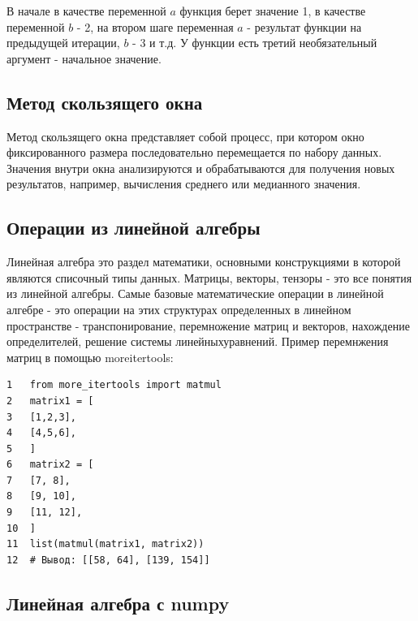 \documentclass[12pt, a4paper]{article}
\begin{document}
В начале в качестве переменной $a$ функция берет значение 1,
в качестве переменной $b$ - 2, на втором шаге переменная $a$ - 
результат функции на предыдущей итерации, $b$ - 3 и т.д. У
функции есть третий необязательный аргумент - начальное значение.

\subsection{Метод скользящего окна}

Метод скользящего окна представляет собой процесс, при котором 
окно фиксированного размера последовательно перемещается по 
набору данных. Значения внутри окна анализируются и 
обрабатываются для получения новых результатов, например, 
вычисления среднего или медианного значения.

\subsection{Операции из линейной алгебры}

Линейная алгебра это раздел математики, основными конструкциями
в которой являются списочный типы данных. Матрицы, векторы, 
тензоры - это все понятия из линейной алгебры.
Самые базовые математические операции в линейной алгебре - это 
операции на этих структурах определенных в линейном 
пространстве - транспонирование, перемножение матриц и 
векторов, нахождение определителей, решение системы 
линейныхуравнений. Пример перемнжения матриц в помощью
more\textunderscore itertools:

\begin{verbatim}
1   from more_itertools import matmul
2   matrix1 = [
3   [1,2,3],
4   [4,5,6],
5   ]
6   matrix2 = [
7   [7, 8],
8   [9, 10],
9   [11, 12],
10  ]
11  list(matmul(matrix1, matrix2))
12  # Вывод: [[58, 64], [139, 154]]
\end{verbatim}

\newpage

\subsection{Линейная алгебра с numpy}
\end{document}
